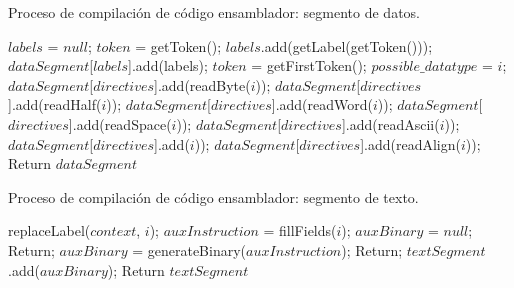 \begin{algorithm}[h]
	\caption{Proceso de compilación de código \gls{ensamblador}: segmento de datos.}
	\label{alg:data_segment_pseudocode}
  	\scriptsize
	\begin{algorithmic}[1]
			\State $labels$ = $null$;		
			\State $token$ = getToken();
			   
					\State $labels$.add(getLabel(getToken()));
				\EndIf
			\EndWhile
			\State $dataSegment$[$labels$].add(labels);
			\State $token$ = getFirstToken();
				  
				\State $possible\_datatype$ = $i$;
					$dataSegment$[$directives$].add(readByte($i$));
				\EndIf
					$dataSegment$[$directives$].add(readHalf($i$));
				\EndIf
					$dataSegment$[$directives$].add(readWord($i$));
				\EndIf
					$dataSegment$[$directives$].add(readSpace($i$));
				\EndIf
					$dataSegment$[$directives$].add(readAscii($i$));
				\EndIf
					$dataSegment$[$directives$].add($i$));
				\EndIf
					$dataSegment$[$directives$].add(readAlign($i$));
				\EndIf
			\EndFor
			 \State Return $dataSegment$
		\EndFunction
	\end{algorithmic}
\end{algorithm}

\begin{algorithm}[h]
	\caption{Proceso de compilación de código \gls{ensamblador}: segmento de texto.}
	\label{alg:text_segment_pseudocode}
  	\scriptsize
	\begin{algorithmic}[1]
			    
				\State replaceLabel($context$, $i$);	   
			\EndFor
			     
				\State $auxInstruction$ = fillFields($i$);
				\State $auxBinary$ = $null$;
				     
					\State Return;
				\EndIf
				$auxBinary$ = generateBinary($auxInstruction$);
					\State Return;
				\EndIf
				$textSegment$.add($auxBinary$);
			\EndFor
			 \State Return $textSegment$
		\EndFunction
	\end{algorithmic}
\end{algorithm}


